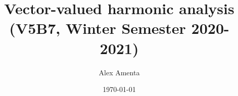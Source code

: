 \title[Vector-valued harmonic analysis]{Vector-valued harmonic analysis \\ (V5B7, Winter Semester 2020-2021)}
\date{\today}

\author[A. Amenta]{Alex Amenta}
\address{\noindent Mathematisches Institut \newline \indent Universit\"at Bonn, Bonn, Germany}


